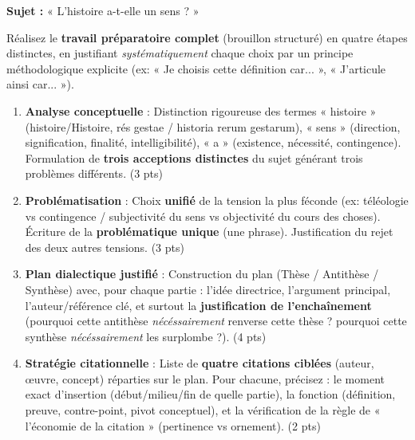 \documentclass[11pt]{article}
\begin{document}
\begin{exercice}
\textbf{Sujet :} « L'histoire a-t-elle un sens ? »

Réalisez le \textbf{travail préparatoire complet} (brouillon structuré) en quatre étapes distinctes, en justifiant \textit{systématiquement} chaque choix par un principe méthodologique explicite (ex: « Je choisis cette définition car... », « J'articule ainsi car... »).

\begin{enumerate}
    \item \textbf{Analyse conceptuelle} : Distinction rigoureuse des termes « histoire » (histoire/Histoire, rés gestae / historia rerum gestarum), « sens » (direction, signification, finalité, intelligibilité), « a » (existence, nécessité, contingence). Formulation de \textbf{trois acceptions distinctes} du sujet générant trois problèmes différents. (3 pts)
    \item \textbf{Problématisation} : Choix \textbf{unifié} de la tension la plus féconde (ex: téléologie vs contingence / subjectivité du sens vs objectivité du cours des choses). Écriture de la \textbf{problématique unique} (une phrase). Justification du rejet des deux autres tensions. (3 pts)
    \item \textbf{Plan dialectique justifié} : Construction du plan (Thèse / Antithèse / Synthèse) avec, pour chaque partie : l'idée directrice, l'argument principal, l'auteur/référence clé, et surtout la \textbf{justification de l'enchaînement} (pourquoi cette antithèse \textit{nécéssairement} renverse cette thèse ? pourquoi cette synthèse \textit{nécéssairement} les surplombe ?). (4 pts)
    \item \textbf{Stratégie citationnelle} : Liste de \textbf{quatre citations ciblées} (auteur, œuvre, concept) réparties sur le plan. Pour chacune, précisez : le moment exact d'insertion (début/milieu/fin de quelle partie), la fonction (définition, preuve, contre-point, pivot conceptuel), et la vérification de la règle de « l'économie de la citation » (pertinence vs ornement). (2 pts)
\end{enumerate}
\end{exercice}
\end{document}

